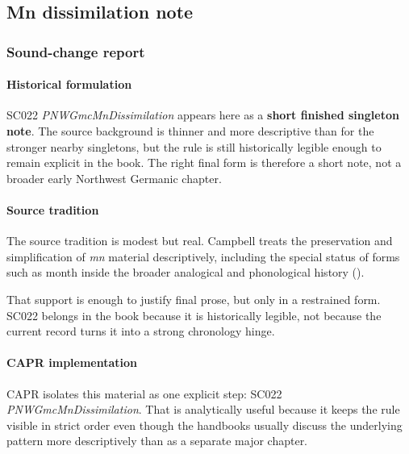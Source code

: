 \documentclass[
  british,
  a4paper,
]{article}
\begin{document}
\subsection{Mn dissimilation note}\label{mn-dissimilation-note}

\subsubsection{Sound-change report}\label{sound-change-report-15}

\paragraph{Historical formulation}\label{historical-formulation-15}

SC022 \emph{PNWGmcMnDissimilation} appears here as a \textbf{short
finished singleton note}. The source background is thinner and more
descriptive than for the stronger nearby singletons, but the rule is
still historically legible enough to remain explicit in the book. The
right final form is therefore a short note, not a broader early
Northwest Germanic chapter.

\paragraph{Source tradition}\label{source-tradition-15}

The source tradition is modest but real. Campbell treats the
preservation and simplification of \emph{mn} material descriptively,
including the special status of forms such as month inside the broader
analogical and phonological history
().

That support is enough to justify final prose, but only in a restrained
form. SC022 belongs in the book because it is historically legible, not
because the current record turns it into a strong chronology hinge.

\paragraph{CAPR implementation}\label{capr-implementation-15}

CAPR isolates this material as one explicit step: SC022
\emph{PNWGmcMnDissimilation}. That is analytically useful because it
keeps the rule visible in strict order even though the handbooks usually
discuss the underlying pattern more descriptively than as a separate
major chapter.
\end{document}
